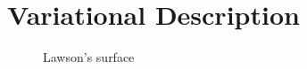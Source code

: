 \documentclass[Thesis.tex]{subfiles}
\begin{document}
\chapter{Variational Description}

\begin{figure}

\caption{Lawson's surface}
\end{figure}

\subfilebibliography
\end{document}
